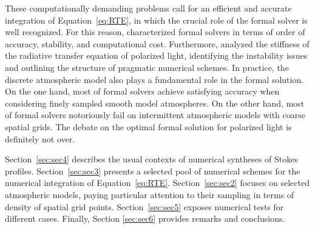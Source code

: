 \documentclass[iop,numberedappendix,twocolappendix,twocolumn]{emulateapj}
\begin{document}
These computationally demanding problems call for an efficient and accurate integration of Equation~\eqref{eq:RTE}, %
in which the crucial role of the formal solver is well recognized.
For this reason,
\citet{janett2017a,janett2017b} characterized formal solvers in terms of order of accuracy, stability, and computational cost.
Furthermore, \citet{janett2018a} analyzed the stiffness of the radiative transfer equation of polarized light,
identifying the instability issues %
and outlining the structure of pragmatic numerical schemes.
In practice, the discrete atmospheric model also plays a fundamental role in the formal solution.
On the one hand, most of formal solvers achieve satisfying accuracy when considering finely sampled smooth model atmospheres.
On the other hand, most of formal solvers notoriously fail on intermittent atmospheric models with coarse spatial grids.
The debate on the optimal formal solution for polarized light is definitely not over.

Section~\ref{sec:sec4} describes the usual contexts of numerical syntheses of Stokes profiles.
Section~\ref{sec:sec3} presents a selected pool of numerical schemes for the numerical integration of Equation~\eqref{eq:RTE}. %
Section~\ref{sec:sec2} focuses on selected atmospheric models, paying particular attention to their sampling in terms of density of spatial grid points.
Section~\ref{sec:sec5} exposes numerical tests for different cases. %
Finally, Section \ref{sec:sec6} provides remarks and conclusions.
%
\end{document}
